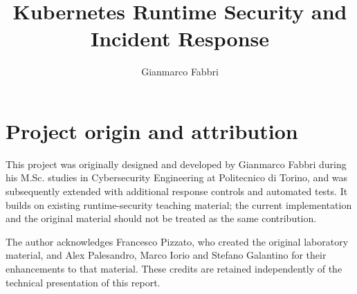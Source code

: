 \documentclass[exercise]{other/netgroup_didattica}
\title{Kubernetes Runtime Security and Incident Response}
\author{\parbox{\linewidth}{\centering Gianmarco Fabbri}}
\begin{document}
\maketitle
\clearpage
\section*{Project origin and attribution}
This project was originally designed and developed by Gianmarco Fabbri during
his M.Sc. studies in Cybersecurity Engineering at Politecnico di Torino, and was
subsequently extended with additional response controls and automated tests.
It builds on existing runtime-security teaching material; the current implementation
and the original material should not be treated as the same contribution.

The author acknowledges Francesco Pizzato, who created the original laboratory
material, and Alex Palesandro, Marco Iorio and Stefano Galantino for their
enhancements to that material. These credits are retained independently of the
technical presentation of this report.

\clearpage
\setcounter{tocdepth}{1}
\tableofcontents
\clearpage




\end{document}
